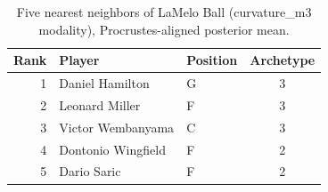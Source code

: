 \begin{table}[htbp]
  \centering\small
  \begin{tabular}{rllc}
    \toprule
    Rank & Player & Position & Archetype \\
    \midrule
    1 & Daniel Hamilton & G & 3 \\
    2 & Leonard Miller & F & 3 \\
    3 & Victor Wembanyama & C & 3 \\
    4 & Dontonio Wingfield & F & 2 \\
    5 & Dario Saric & F & 2 \\
    \bottomrule
  \end{tabular}
  \caption{Five nearest neighbors of LaMelo Ball (curvature_m3 modality), Procrustes-aligned posterior mean.}
  \label{tab:LaMelo_Ball_neighbors_curvature_m3}
\end{table}


